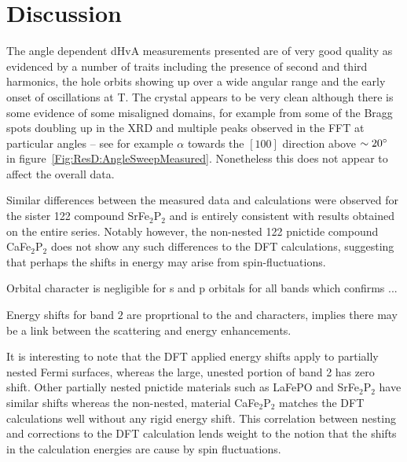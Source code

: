 
\section{Discussion}

The angle dependent \ac{dHvA} measurements presented are of very good quality as evidenced by a number of traits including the presence of second and third harmonics, the hole orbits showing up over a wide angular range and the early onset of oscillations at \unit[6]{T}. The crystal appears to be very clean although there is some evidence of some misaligned domains, for example from some of the Bragg spots doubling up in the \ac{XRD} and multiple peaks observed in the \ac{FFT} at particular angles -- see for example $\alpha$ towards the $[100]$ direction above $\sim 20\degree$ in figure~\ref{Fig:ResD:AngleSweepMeasured}. Nonetheless this does not appear to affect the overall data.




Similar differences between the measured data and calculations were observed for the sister 122 compound SrFe$_2$P$_2$\cite{Analytis2009} and is entirely consistent with results obtained on the entire \BaFePAs series\cite{Shishido2010}. Notably however, the non-nested 122 pnictide compound CaFe$_2$P$_2$ does not show any such differences to the DFT calculations, suggesting that perhaps the shifts in energy may arise from spin-fluctuations.

Orbital character is negligible for s and p orbitals for all bands which confirms ...

Energy shifts for band $2$ are proprtional to the \DzTwo and \DxzDyz characters, implies there may be a link between the \kz scattering and energy enhancements.


It is interesting to note that the DFT applied energy shifts apply to partially nested Fermi surfaces, whereas the large, unested portion of band 2 has zero shift. Other partially nested pnictide materials such as LaFePO\cite{Carrington2009} and SrFe$_{2}$P$_{2}$\cite{Analytis2009} have similar shifts whereas the non-nested, material CaFe$_{2}$P$_{2}$\cite{Coldea2009} matches the DFT calculations well without any rigid energy shift. This correlation between nesting and corrections to the DFT calculation lends weight to the notion that the shifts in the calculation energies are cause by spin fluctuations.


